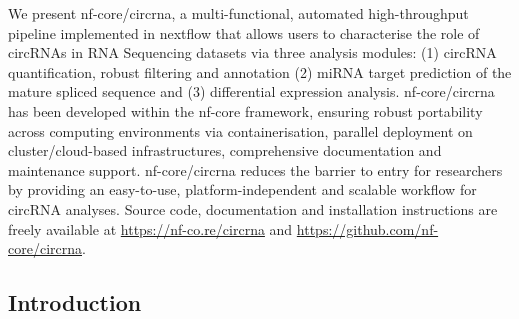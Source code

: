 We present nf-core/circrna, a multi-functional, automated high-throughput pipeline implemented in nextflow that allows users to characterise the role of circRNAs in RNA Sequencing datasets via three analysis modules: (1) circRNA quantification, robust filtering and annotation (2) miRNA target prediction of the mature spliced sequence and (3) differential expression analysis. nf-core/circrna has been developed within the nf-core framework, ensuring robust portability across computing environments via containerisation, parallel deployment on cluster/cloud-based infrastructures, comprehensive documentation and maintenance support. nf-core/circrna reduces the barrier to entry for researchers by providing an easy-to-use, platform-independent and scalable workflow for circRNA analyses. Source code, documentation and installation instructions are freely available at \href{https://nf-co.re/circrna}{https://nf-co.re/circrna} and \href{https://github.com/nf-core/circrna}{https://github.com/nf-core/circrna}.


\subsection{Introduction}

